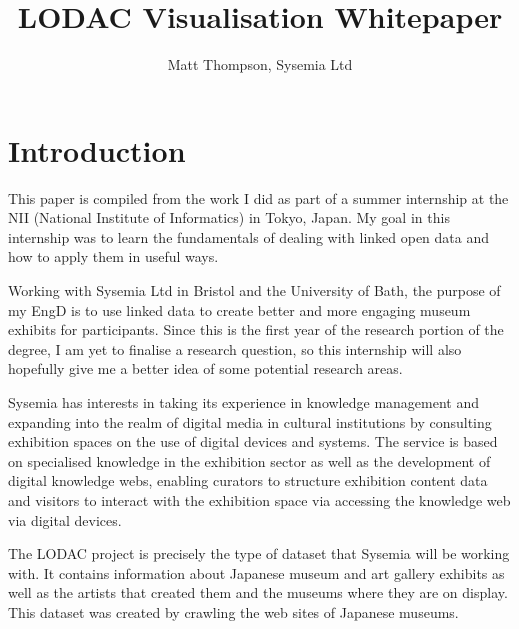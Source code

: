 \documentclass[11pt]{article}
\title{LODAC Visualisation Whitepaper}
\author{Matt Thompson, Sysemia Ltd}
\begin{document}
\maketitle
\clearpage
\tableofcontents
\clearpage


\section{Introduction}
This paper is compiled from the work I did as part of a summer internship at the NII (National Institute of Informatics) in Tokyo, Japan. My goal in this internship was to learn the fundamentals of dealing with linked open data and how to apply them in useful ways.

Working with Sysemia Ltd in Bristol and the University of Bath, the purpose of my EngD is to use linked data to create better and more engaging museum exhibits for participants. Since this is the first year of the research portion of the degree, I am yet to finalise a research question, so this internship will also hopefully give me a better idea of some potential research areas.


Sysemia has interests in taking its experience in knowledge management and expanding into the realm of digital media in cultural institutions by consulting exhibition spaces on the use of digital devices and systems. The service is based on specialised knowledge in the exhibition sector as well as the development of digital knowledge webs, enabling curators to structure exhibition content data and visitors to interact with the exhibition space via accessing the knowledge web via digital devices.

The LODAC project is precisely the type of dataset that Sysemia will be working with. It contains information about Japanese museum and art gallery exhibits as well as the artists that created them and the museums where they are on display. This dataset was created by crawling the web sites of Japanese museums.
\end{document}
